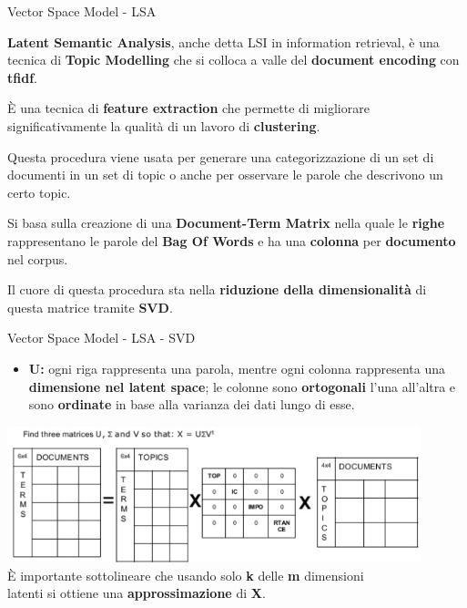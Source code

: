 \documentclass[british]{beamer}
\begin{document}
\begin{frame}{Vector Space Model - LSA}
	
	\textbf{Latent Semantic Analysis}, anche detta LSI in information retrieval, \`{e} una tecnica di \textbf{Topic Modelling} che si colloca a valle del \textbf{document encoding} con \textbf{tfidf}. 
	
	\`{E} una tecnica di \textbf{feature extraction} che permette di migliorare significativamente la qualit\`{a} di un lavoro di \textbf{clustering}.
	
	Questa procedura viene usata per generare una categorizzazione di un \alert{set di documenti} in un \alert{set di topic} o anche per osservare le parole che descrivono un certo topic.
	
	Si basa sulla creazione di una \textbf{Document-Term Matrix} nella quale le \textbf{righe} rappresentano le parole del \textbf{Bag Of Words} e ha una \textbf{colonna} per \textbf{documento} nel corpus.
	
	Il cuore di questa procedura sta nella \textbf{riduzione della dimensionalit\`{a}} di questa matrice tramite \textbf{SVD}.
	
\end{frame}

\begin{frame}{Vector Space Model - LSA - SVD}
	\begin{itemize}
		\item \textbf{U: }ogni riga rappresenta una parola, mentre ogni colonna rappresenta una \textbf{dimensione nel latent space}; le colonne sono \textbf{ortogonali} l'una all'altra e sono \textbf{ordinate} in base alla varianza dei dati lungo di esse.
	\end{itemize}
	\includegraphics[width=0.9\textwidth,
	 height=0.4\textheight]{./Imgs/LSA1}\\
	 \`{E} importante sottolineare che usando solo \textbf{k} delle \textbf{m} dimensioni\\ latenti si ottiene una \textbf{approssimazione} di \textbf{X}.
\end{frame}
\end{document}

